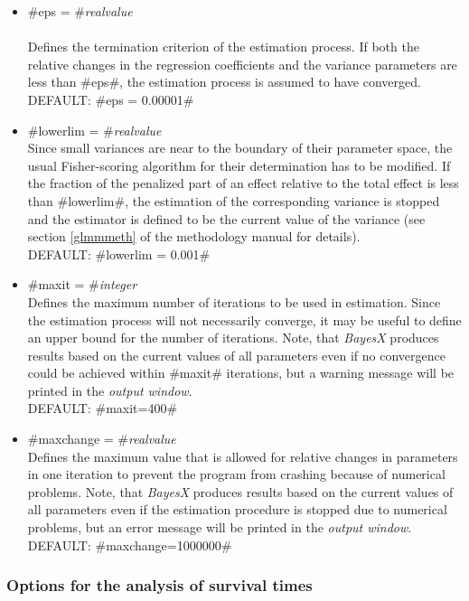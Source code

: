 \begin{itemize}
\item #eps = #{\em realvalue } \\
\\Defines the termination criterion of the estimation process. If
both the relative changes in the regression coefficients and the
variance parameters are less than #eps#, the estimation process is
assumed to have converged.\\
DEFAULT: #eps = 0.00001#

\item #lowerlim = #{\em realvalue } \\
Since small variances are near to the boundary of their parameter
space, the usual Fisher-scoring algorithm for their determination
has to be modified. If the fraction of the penalized part of an
effect relative to the total effect is less than #lowerlim#, the
estimation of the corresponding variance is stopped and the
estimator is defined to be the current value of the variance (see
section \ref*{glmmmeth} of the methodology manual for details).\\
DEFAULT: #lowerlim = 0.001#

\item #maxit = #{\em integer } \\
Defines the maximum number of iterations to be used in estimation.
Since the estimation process will not necessarily converge, it may
be useful to define an upper bound for the number of iterations.
Note, that {\it BayesX} produces results based on the current
values of all parameters even if no convergence could be achieved
within #maxit# iterations, but a warning message will be printed
in the {\it output window}.\\
DEFAULT: #maxit=400#

\item #maxchange = #{\em realvalue } \\
Defines the maximum value that is allowed for relative changes in
parameters in one iteration to prevent the program from crashing
because of numerical problems. Note, that {\it BayesX} produces
results based on the current values of all parameters even if the
estimation procedure is stopped due to numerical problems, but an
error message will be printed in the {\it output window}.\\
DEFAULT: #maxchange=1000000#
\end{itemize}

\subsubsection*{Options for the analysis of survival times}
\label{remlest_survival_options}

